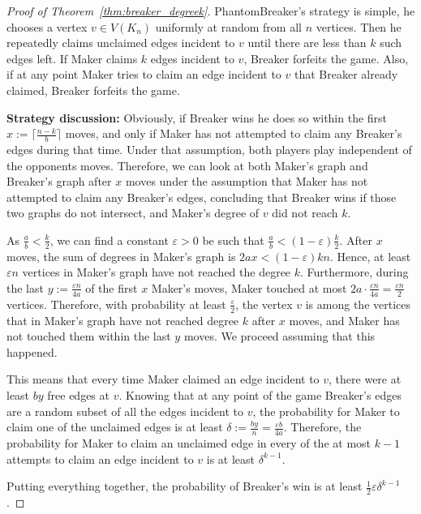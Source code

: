 \documentclass[11pt, a4paper]{article}
\numberwithin{equation}{section}
\numberwithin{figure}{section}
\newcommand{\eps}{\varepsilon}
\begin{document}
\begin{proof}[Proof of Theorem~\ref{thm:breaker_degreek}]
PhantomBreaker's strategy is simple, he chooses a vertex $v \in V(K_n)$ uniformly at random from all $n$ vertices. Then he repeatedly claims unclaimed edges incident to $v$ until there are less than $k$ such edges left. If Maker claims $k$ edges incident to $v$, Breaker forfeits the game. Also, if at any point Maker tries to claim an edge incident to $v$ that Breaker already claimed, Breaker forfeits the game.

\smallskip

\textbf{Strategy discussion:}
Obviously, if Breaker wins he does so within the first $x:=\lceil \frac{n-k}{b} \rceil$ moves, and only if Maker has not attempted to claim any Breaker's edges during that time. Under that assumption, both players play independent of the opponents moves.
Therefore, we can look at both Maker's graph and Breaker's graph after $x$ moves under the assumption that Maker has not attempted to claim any Breaker's edges, concluding that Breaker wins if those two graphs do not intersect, and Maker's degree of $v$ did not reach $k$.

As $\frac{a}{b}<\frac{k}{2}$, we can find a constant $\eps>0$ be such that 
$\frac{a}{b}<(1-\eps)\frac{k}{2}$. After $x$ moves, the sum of degrees in Maker's graph is $2ax <(1-\eps)kn$. Hence, at least $\eps n$ vertices in Maker's graph have not reached the degree $k$.
Furthermore, during the last $y:=\frac{\eps n}{4a}$ of the first $x$ Maker's moves, Maker touched at most $2a \cdot \frac{\eps n}{4a} = \frac{\eps n}{2}$ vertices. Therefore, with probability at least $\frac{\eps}{2}$, the vertex $v$ is among the vertices that in Maker's graph have not reached degree $k$ after $x$ moves, and Maker has not touched them within the last $y$ moves. We proceed assuming that this happened.

This means that every time Maker claimed an edge incident to $v$, there were at least $by$ free edges at $v$. Knowing that at any point of the game Breaker's edges are a random subset of all the edges incident to $v$, the probability for Maker to claim one of the unclaimed edges is at least $\delta:=\frac{by}{n} = \frac{\eps b}{4a}$. Therefore, the probability for Maker to claim an unclaimed edge in every of the at most $k-1$ attempts to claim an edge incident to $v$ is at least $\delta^{k-1}$.

Putting everything together, the probability of Breaker's win is at least $\frac{1}{2}\eps \delta^{k-1}$.
\end{proof}
\end{document}
